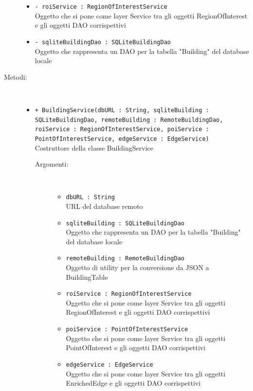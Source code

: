 \documentclass[../DefinizioneDiProdotto.tex]{subfiles}
\begin{document}
\begin{description}
\begin{itemize}
		\item \texttt{- roiService : RegionOfInterestService}\\
		Oggetto che si pone come layer Service tra gli oggetti RegionOfInterest e gli oggetti DAO corrispettivi
		
		\item \texttt{- sqliteBuildingDao : SQLiteBuildingDao}\\
		Oggetto che rappresenta un DAO per la tabella "Building" del database locale
		
	\end{itemize}
	\item[Metodi:] \
	\begin{itemize}
		\item \texttt{+ BuildingService(dbURL : String, sqliteBuilding : SQLiteBuildingDao, remoteBuilding : RemoteBuildingDao, roiService : RegionOfInterestService, poiService : PointOfInterestService, edgeService : EdgeService)}\\
		Costruttore della classe BuildingService
		\begin{description}
			\item[Argomenti:] \
			\begin{itemize}
				\item \texttt{dbURL : String}\\
				URL del database remoto\item \texttt{sqliteBuilding : SQLiteBuildingDao}\\
				Oggetto che rappresenta un DAO per la tabella "Building" del database locale\item \texttt{remoteBuilding : RemoteBuildingDao}\\
				Oggetto di utility per la conversione da JSON a BuildingTable\item \texttt{roiService : RegionOfInterestService}\\
				Oggetto che si pone come layer Service tra gli oggetti RegionOfInterest e gli oggetti DAO corrispettivi\item \texttt{poiService : PointOfInterestService}\\
				Oggetto che si pone come layer Service tra gli oggetti PointOfInterest e gli oggetti DAO corrispettivi\item \texttt{edgeService : EdgeService}\\
				Oggetto che si pone come layer Service tra gli oggetti EnrichedEdge e gli oggetti DAO corrispettivi\end{itemize}
		\end{description}

\end{itemize}
\end{description}
\end{document}
